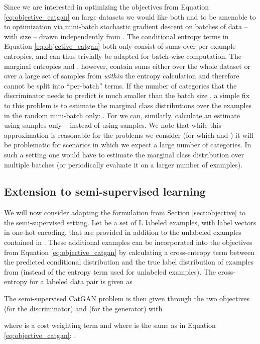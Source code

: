 \documentclass{article} \usepackage{iclr2016_conference,times}
\begin{document}
Since we are interested in optimizing the objectives from Equation
\eqref{eq:objective_catgan} on large datasets we would like both
 and  to be amenable to to optimization via mini-batch
stochastic gradient descent on batches  of data -- with
size  -- drawn independently from . The conditional entropy terms in
Equation \eqref{eq:objective_catgan} both only consist of sums over
per example entropies, and can thus trivially be adapted for batch-wise
computation. The marginal entropies  and , however,
contain sums either over the whole dataset  or over a
large set of samples from  \emph{within} the entropy
calculation and therefore cannot be split into ``per-batch'' terms. 
If the number of categories  that the discriminator needs
to predict is much smaller than the batch size , a simple fix to
this problem is to estimate the marginal class distributions over the
 examples in the random mini-batch only: .
For  we can, similarly, calculate an estimate
using  samples only -- instead of using  samples. We note
that while this approximation is reasonable for the problems we
consider (for which  and ) it will be problematic for scenarios in
which we expect a large number of categories. In such a setting one
would have to estimate the marginal class distribution over multiple batches
(or periodically evaluate it on a larger number of examples).

\subsection{Extension to semi-supervised learning}
\label{sect:semi_supervised}
We will now consider adapting the formulation from Section
\ref{sect:objective} to the semi-supervised setting. Let
 be a
set of L labeled examples, with label vectors 
in one-hot encoding, that are provided in addition to the 
unlabeled examples contained in . These additional
examples can be incorporated into the objectives from Equation
\eqref{eq:objective_catgan} by calculating a cross-entropy term
between the predicted conditional distribution  and
the true label distribution of examples from  (instead
of the entropy term  used for unlabeled examples). The
cross-entropy for a labeled data pair  is given as

The semi-supervised CatGAN problem is then given through the two
objectives  (for the discriminator) and  (for the generator) with

where  is a cost weighting term and where 
is the same as in Equation \eqref{eq:objective_catgan}:
.
\end{document}
